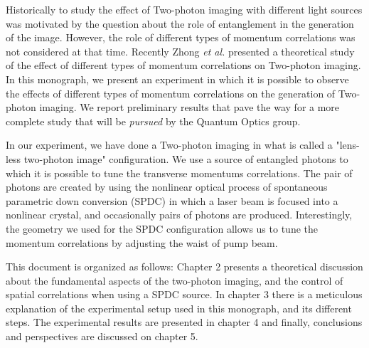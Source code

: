 Historically to study the effect of Two-photon imaging with different light sources was motivated by the question about the role of 
entanglement in the generation of the image. However, the role of different types of momentum correlations was not considered at that time. 
Recently Zhong \textit{et al.} presented a theoretical study of the effect of different types of momentum correlations on 
Two-photon imaging\cite{zhong}. In this monograph, we present an experiment in which it is possible to observe the effects of 
different types of momentum correlations on the generation of Two-photon imaging. We report preliminary results that pave the way for a more complete
study that will be \textit{pursued} by the Quantum Optics group.
 

In our experiment, we have done a Two-photon imaging in what is called a "lens-less two-photon image" configuration\cite{lensless}. We use a source of entangled 
photons to which it is possible to tune the transverse momentums
 correlations. The pair of photons are created by using the nonlinear optical process of spontaneous parametric down conversion (SPDC) in which 
a laser beam is focused into a nonlinear crystal, and occasionally pairs of photons are produced.  Interestingly, the geometry we used for the SPDC configuration
allows us to tune the momentum correlations by adjusting the waist of pump beam\cite{omar}.






This document is organized as follows: Chapter 2 presents a theoretical discussion about the fundamental 
aspects of the two-photon imaging, and the control of spatial correlations when using a SPDC source.  
In chapter 3 there is a meticulous explanation of the experimental setup used in this monograph, and its different steps.
The experimental results are presented in chapter 4 and finally, conclusions and perspectives are discussed on chapter 5.

